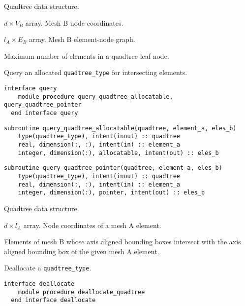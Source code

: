 \documentclass{article}
\begin{document}
\begin{description}[font=\ttfamily\bfseries,leftmargin=2.2\parindent,labelindent=1.7\parindent,noitemsep]
  \item[quadtree] Quadtree data structure.
  \item[positions] $d \times V_B$ array. Mesh B node coordinates.
  \item[enlist] $l_A \times E_B$ array. Mesh B element-node graph.
  \item[max\_size] Maximum number of elements in a quadtree leaf node.
\end{description}

\noindent Query an allocated \verb+quadtree_type+ for intersecting elements.
  
\begin{lstlisting}[language=FORTRAN]
  interface query
    module procedure query_quadtree_allocatable, query_quadtree_pointer
  end interface query
\end{lstlisting}
    
\begin{lstlisting}[language=FORTRAN]
  subroutine query_quadtree_allocatable(quadtree, element_a, eles_b)
    type(quadtree_type), intent(inout) :: quadtree
    real, dimension(:, :), intent(in) :: element_a
    integer, dimension(:), allocatable, intent(out) :: eles_b
\end{lstlisting}
  
\begin{lstlisting}[language=FORTRAN]
  subroutine query_quadtree_pointer(quadtree, element_a, eles_b)
    type(quadtree_type), intent(inout) :: quadtree
    real, dimension(:, :), intent(in) :: element_a
    integer, dimension(:), pointer, intent(out) :: eles_b
\end{lstlisting}

\begin{description}[font=\ttfamily\bfseries,leftmargin=2.2\parindent,labelindent=1.7\parindent,noitemsep]
  \item[quadtree] Quadtree data structure.
  \item[element\_a] $d \times l_A$ array. Node coordinates of a mesh A element.
  \item[eles\_b] Elements of mesh B whose axis aligned bounding boxes intersect
    with the axis aligned bounding box of the given mesh A element.
\end{description}

\noindent Deallocate a \verb+quadtree_type+.
  
\begin{lstlisting}[language=FORTRAN]
  interface deallocate
    module procedure deallocate_quadtree
  end interface deallocate
\end{lstlisting}
  
\end{document}
